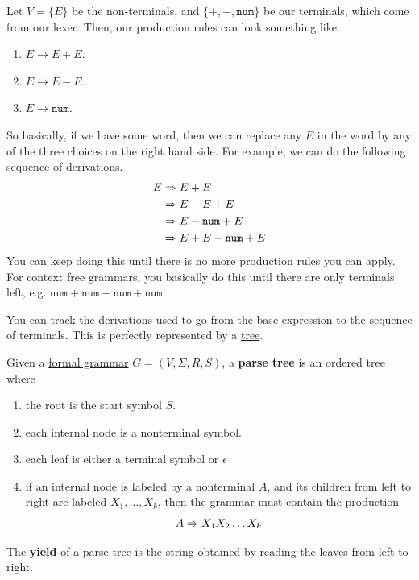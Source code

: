   \begin{example}
    \label{ex:a-grammar-for-additive-expressions}
    Let $V = \{E\}$ be the non-terminals, and $\{+, -, \texttt{num}\}$ be our terminals, which come from our lexer. Then, our production rules can look something like. 
    \begin{enumerate}
      \item $E \to E + E$. 
      \item $E \to E - E$. 
      \item $E \to \texttt{num}$. 
    \end{enumerate}
    So basically, if we have some word, then we can replace any $E$ in the word by any of the three choices on the right hand side. For example, we can do the following sequence of derivations. 
    \begin{align}
      E & \Rightarrow E + E \\ 
        & \Rightarrow E - E + E \\
        & \Rightarrow E - \texttt{num} + E\\
        & \Rightarrow E + E - \texttt{num} + E 
    \end{align}
    You can keep doing this until there is no more production rules you can apply. For context free grammars, you basically do this until there are only terminals left, e.g. $\texttt{num} + \texttt{num} - \texttt{num} + \texttt{num}$. 
  \end{example}

	You can track the derivations used to go from the base expression to the sequence of terminals. This is perfectly represented by a \hyperref[dsa-def:tree]{tree}. 

  \begin{definition}
    \label{def:parse-tree}
    Given a \hyperref[def:formal-grammar]{formal grammar} $G = (V, \Sigma, R, S)$, a \textbf{parse tree} is an ordered tree where 
		\begin{enumerate}
		  \item the root is the start symbol $S$. 
			\item each internal node is a nonterminal symbol. 
			\item each leaf is either a terminal symbol or $\epsilon$ 
			\item if an internal node is labeled by a nonterminal $A$, and its children from left to right are labeled $X_1, \ldots, X_k$, then the grammar must contain the production 
				\begin{equation}
				  A \Rightarrow X_1 X_2 \ldots X_k
				\end{equation}
		\end{enumerate}

		The \textbf{yield} of a parse tree is the string obtained by reading the leaves from left to right. 
  \end{definition}

